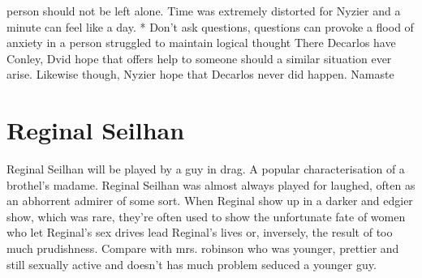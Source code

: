 \documentclass[12pt]{book}
\begin{document}
person should not be left alone. Time was extremely distorted for Nyzier and a minute can feel like a day. * Don't ask questions, questions can provoke a flood of anxiety in a person struggled to maintain logical thought There Decarlos have Conley, Dvid hope that offers help to someone should a similar situation ever arise. Likewise though, Nyzier hope that Decarlos never did happen. Namaste



\chapter{Reginal Seilhan}

Reginal Seilhan will be played by a guy in drag. A popular characterisation of a brothel's madame. Reginal Seilhan was almost always played for laughed, often as an abhorrent admirer of some sort. When Reginal show up in a darker and edgier show, which was rare, they're often used to show the unfortunate fate of women who let Reginal's sex drives lead Reginal's lives or, inversely, the result of too much prudishness. Compare with mrs. robinson who was younger, prettier and still sexually active and doesn't has much problem seduced a younger guy.
\end{document}
